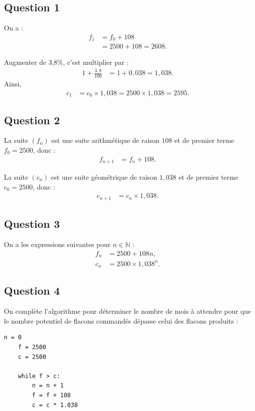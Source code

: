 \subsection*{Question 1}

On a :
\begin{align*}
	f_1 &= f_0 + 108 \\
	&= 2500 + 108 = 2608.
\end{align*}

Augmenter de 3,8\%, c'est multiplier par :
\begin{align*}
	1 + \frac{3,8}{100} &= 1 + 0,038 = 1,038.
\end{align*}
Ainsi, 
\begin{align*}
	c_1 &= c_0 \times 1,038 = 2500 \times 1,038 = 2595.
\end{align*}

\subsection*{Question 2}

La suite $(f_n)$ est une suite arithmétique de raison $108$ et de premier terme $f_0 = 2500$, donc :
\begin{align*}
	f_{n+1} &= f_n + 108.
\end{align*}

La suite $(c_n)$ est une suite géométrique de raison $1,038$ et de premier terme $c_0 = 2500$, donc :
\begin{align*}
	c_{n+1} &= c_n \times 1,038.
\end{align*}

\subsection*{Question 3}

On a les expressions suivantes pour $n \in \mathbb{N}$ :
\begin{align*}
	f_n &= 2500 + 108n, \\
	c_n &= 2500 \times 1,038^n.
\end{align*}

\subsection*{Question 4}

On complète l'algorithme pour déterminer le nombre de mois à attendre pour que le nombre potentiel de flacons commandés dépasse celui des flacons produits :
\begin{lstlisting}[style=python]
	n = 0
	f = 2500
	c = 2500
	
	while f > c:
		n = n + 1
		f = f + 108
		c = c * 1.038
\end{lstlisting}

